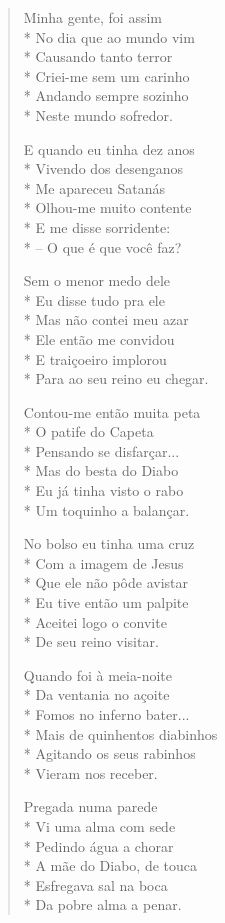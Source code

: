 \begin{verse}
Minha gente, foi assim\\*
No dia que ao mundo vim\\*
Causando tanto terror\\*
Criei-me sem um carinho\\*
Andando sempre sozinho\\*
Neste mundo sofredor.

E quando eu tinha dez anos\\*
Vivendo dos desenganos\\*
Me apareceu Satanás\\*
Olhou-me muito contente\\*
E me disse sorridente:\\*
– O que é que você faz?

Sem o menor medo dele\\*
Eu disse tudo pra ele\\*
Mas não contei meu azar\\*
Ele então me convidou\\*
E traiçoeiro implorou\\*
Para ao seu reino eu chegar.

Contou-me então muita peta\\*
O patife do Capeta\\*
Pensando se disfarçar...\\*
Mas do besta do Diabo\\*
Eu já tinha visto o rabo\\*
Um toquinho a balançar.

No bolso eu tinha uma cruz\\*
Com a imagem de Jesus\\*
Que ele não pôde avistar\\*
Eu tive então um palpite\\*
Aceitei logo o convite\\*
De seu reino visitar.

Quando foi à meia-noite\\*
Da ventania no açoite\\*
Fomos no inferno bater...\\*
Mais de quinhentos diabinhos\\*
Agitando os seus rabinhos\\*
Vieram nos receber.

Pregada numa parede\\*
Vi uma alma com sede\\*
Pedindo água a chorar\\*
A mãe do Diabo, de touca\\*
Esfregava sal na boca\\*
Da pobre alma a penar.


\end{verse}
